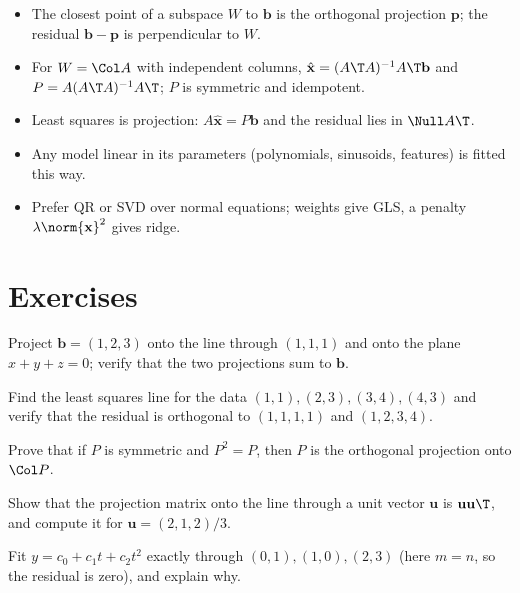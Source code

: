 \begin{summarybox}
\begin{itemize}
  \item The closest point of a subspace $W$ to $\mathbf{b}$ is the orthogonal projection $\mathbf{p}$; the residual $\mathbf{b}-\mathbf{p}$ is perpendicular to $W$.
  \item For $W=\Col A$ with independent columns, $\hat{\mathbf{x}}=(A\T A)^{-1}A\T\mathbf{b}$ and $P=A(A\T A)^{-1}A\T$; $P$ is symmetric and idempotent.
  \item Least squares is projection: $A\hat{\mathbf{x}}=P\mathbf{b}$ and the residual lies in $\Null A\T$.
  \item Any model linear in its parameters (polynomials, sinusoids, features) is fitted this way.
  \item Prefer QR or SVD over normal equations; weights give GLS, a penalty $\lambda\norm{\mathbf{x}}^2$ gives ridge.
\end{itemize}
\end{summarybox}

\section{Exercises}

\begin{exercise}
Project $\mathbf{b}=(1,2,3)$ onto the line through $(1,1,1)$ and onto the plane $x+y+z=0$; verify that the two projections sum to $\mathbf{b}$.
\end{exercise}

\begin{exercise}
Find the least squares line for the data $(1,1),(2,3),(3,4),(4,3)$ and verify that the residual is orthogonal to $(1,1,1,1)$ and $(1,2,3,4)$.
\end{exercise}

\begin{exercise}
Prove that if $P$ is symmetric and $P^2=P$, then $P$ is the orthogonal projection onto $\Col P$.
\end{exercise}

\begin{exercise}
Show that the projection matrix onto the line through a unit vector $\mathbf{u}$ is $\mathbf{u}\mathbf{u}\T$, and compute it for $\mathbf{u}=(2,1,2)/3$.
\end{exercise}

\begin{exercise}
Fit $y=c_0+c_1t+c_2t^2$ exactly through $(0,1),(1,0),(2,3)$ (here $m=n$, so the residual is zero), and explain why.
\end{exercise}

